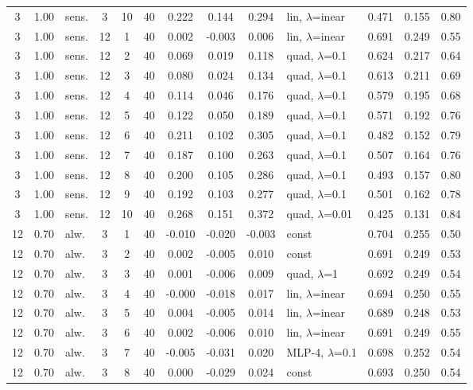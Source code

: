 \documentclass[10pt]{article}
\begin{document}
\begin{scriptsize}
\begin{longtable}{cclcc c ccc l ccc}
3 & 1.00 & sens. & 3 & 10 & 40 & 0.222 & 0.144 & 0.294 & lin, $\lambda$=inear & 0.471 & 0.155 & 0.80 \\
3 & 1.00 & sens. & 12 & 1 & 40 & 0.002 & -0.003 & 0.006 & lin, $\lambda$=inear & 0.691 & 0.249 & 0.55 \\
3 & 1.00 & sens. & 12 & 2 & 40 & 0.069 & 0.019 & 0.118 & quad, $\lambda$=0.1 & 0.624 & 0.217 & 0.64 \\
3 & 1.00 & sens. & 12 & 3 & 40 & 0.080 & 0.024 & 0.134 & quad, $\lambda$=0.1 & 0.613 & 0.211 & 0.69 \\
3 & 1.00 & sens. & 12 & 4 & 40 & 0.114 & 0.046 & 0.176 & quad, $\lambda$=0.1 & 0.579 & 0.195 & 0.68 \\
3 & 1.00 & sens. & 12 & 5 & 40 & 0.122 & 0.050 & 0.189 & quad, $\lambda$=0.1 & 0.571 & 0.192 & 0.76 \\
3 & 1.00 & sens. & 12 & 6 & 40 & 0.211 & 0.102 & 0.305 & quad, $\lambda$=0.1 & 0.482 & 0.152 & 0.79 \\
3 & 1.00 & sens. & 12 & 7 & 40 & 0.187 & 0.100 & 0.263 & quad, $\lambda$=0.1 & 0.507 & 0.164 & 0.76 \\
3 & 1.00 & sens. & 12 & 8 & 40 & 0.200 & 0.105 & 0.286 & quad, $\lambda$=0.1 & 0.493 & 0.157 & 0.80 \\
3 & 1.00 & sens. & 12 & 9 & 40 & 0.192 & 0.103 & 0.277 & quad, $\lambda$=0.1 & 0.501 & 0.162 & 0.78 \\
3 & 1.00 & sens. & 12 & 10 & 40 & 0.268 & 0.151 & 0.372 & quad, $\lambda$=0.01 & 0.425 & 0.131 & 0.84 \\
12 & 0.70 & alw. & 3 & 1 & 40 & -0.010 & -0.020 & -0.003 & const & 0.704 & 0.255 & 0.50 \\
12 & 0.70 & alw. & 3 & 2 & 40 & 0.002 & -0.005 & 0.010 & const & 0.691 & 0.249 & 0.53 \\
12 & 0.70 & alw. & 3 & 3 & 40 & 0.001 & -0.006 & 0.009 & quad, $\lambda$=1 & 0.692 & 0.249 & 0.54 \\
12 & 0.70 & alw. & 3 & 4 & 40 & -0.000 & -0.018 & 0.017 & lin, $\lambda$=inear & 0.694 & 0.250 & 0.55 \\
12 & 0.70 & alw. & 3 & 5 & 40 & 0.004 & -0.005 & 0.014 & lin, $\lambda$=inear & 0.689 & 0.248 & 0.53 \\
12 & 0.70 & alw. & 3 & 6 & 40 & 0.002 & -0.006 & 0.010 & lin, $\lambda$=inear & 0.691 & 0.249 & 0.55 \\
12 & 0.70 & alw. & 3 & 7 & 40 & -0.005 & -0.031 & 0.020 & MLP-4, $\lambda$=0.1 & 0.698 & 0.252 & 0.54 \\
12 & 0.70 & alw. & 3 & 8 & 40 & 0.000 & -0.029 & 0.024 & const & 0.693 & 0.250 & 0.54 \\

\end{longtable}
\end{scriptsize}
\end{document}
